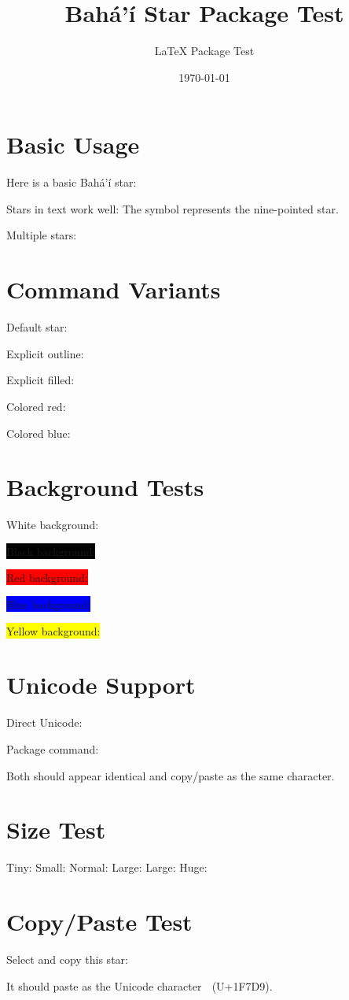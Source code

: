 \documentclass{article}
\title{Bahá'í Star Package Test}
\author{LaTeX Package Test}
\date{\today}
\begin{document}
\maketitle

\section{Basic Usage}

Here is a basic Bahá'í star: \bahaistar

Stars in text work well: The \bahaistar{} symbol represents the nine-pointed star.

Multiple stars: \bahaistar{} \bahaistar{} \bahaistar

\section{Command Variants}

Default star: \bahaistar

Explicit outline: \bahaistaroutline

Explicit filled: \bahaistarfilled

Colored red: 

Colored blue: 

\section{Background Tests}

White background: \bahaistar

\colorbox{black}{\color{white}Black background: \bahaistar}

\colorbox{red}{Red background: \bahaistar}

\colorbox{blue}{\color{white}Blue background: \bahaistar}

\colorbox{yellow}{Yellow background: \bahaistar}

\section{Unicode Support}

Direct Unicode: 🟙

Package command: \bahaistar

Both should appear identical and copy/paste as the same character.

\section{Size Test}

{\tiny Tiny: \bahaistar}
{\small Small: \bahaistar}
{\normalsize Normal: \bahaistar}
{\large Large: \bahaistar}
{\Large Large: \bahaistar}
{\huge Huge: \bahaistar}

\section{Copy/Paste Test}

Select and copy this star: \bahaistar

It should paste as the Unicode character 🟙 (U+1F7D9).
\end{document}
